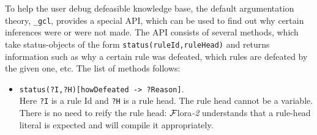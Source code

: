 \documentclass[11pt]{article}
\newcommand{\FLORA}{{\mbox{\sc ${\cal F}${lora}\rm\emph{-2}}}\xspace}
\begin{document}
To help the user debug defeasible knowledge base, the default argumentation
theory, {\tt \_gcl}, provides a special API, which can be used to find out
why certain inferences were or were not made.
The API consists of several methods, which take status-objects of the form
{\tt status(ruleId,ruleHead)} and returns information such as why a certain
rule was defeated, which rules are defeated by the given one, etc.
The list of methods follows:
\begin{itemize}
\item  {\tt status(?I,?H)[howDefeated -> ?Reason]}.\\
  Here {\tt ?I} is a rule Id and {\tt ?H} is a rule head. The rule head
  cannot be a variable. There is no need to reify the rule head: \FLORA
  understands that a rule-head literal is expected and will compile it
  appropriately.  


\end{itemize}
\end{document}
